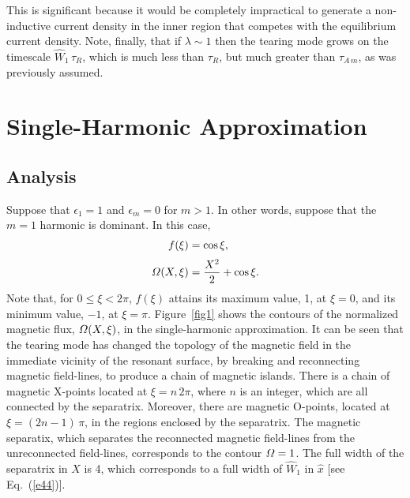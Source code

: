 \documentclass[12pt,prb,aps]{revtex4-1}
\begin{document}
This is significant because it would be completely impractical to generate a non-inductive current density
in the inner region that competes with the equilibrium current density.  Note, finally, that if $\lambda\sim 1$ then the tearing mode grows on the timescale $\hat{W}_1\,\tau_R$, which is much less than $\tau_R$, but much greater than
$\tau_{A\,m}$, as was previously assumed. 

\section{Single-Harmonic Approximation}\label{s1}
\subsection{Analysis}
Suppose that $\epsilon_1=1$ and $\epsilon_m=0$ for $m>1$. In other words, suppose that the $m=1$ harmonic
is dominant. In this case,
\begin{align}
f(\xi) &= \cos\xi,\label{e71}\\[0.5ex]
{\mit\Omega}(X,\xi) &= \frac{X^2}{2}+\cos\xi.
\end{align}
Note that, for $0\leq \xi < 2\pi$, $f(\xi)$ attains its maximum value, 1, at $\xi=0$, and its minimum value, $-1$, at $\xi=\pi$. 
Figure~\ref{fig1} shows the contours of the normalized magnetic flux, ${\mit\Omega}(X,\xi)$, in the single-harmonic approximation. It can be seen that the tearing mode has changed the
topology of the magnetic field in the immediate vicinity of the resonant surface, by breaking and reconnecting magnetic field-lines,  to produce a chain of magnetic islands. There is a chain of magnetic
X-points located at $\xi=n\,2\pi$, where $n$ is an integer, which are all connected by the separatrix. Moreover, there are magnetic O-points, located at $\xi=(2n-1)\,\pi$, in the regions enclosed by the separatrix. The magnetic
separatix, which separates the reconnected magnetic field-lines from the unreconnected field-lines, corresponds to
the contour ${\mit\Omega}=1$. The full width of the separatrix in $X$ is 4, which corresponds to a full width
of $\hat{W}_1$ in $\hat{x}$ [see Eq.~(\ref{e44})]. 
\end{document}
